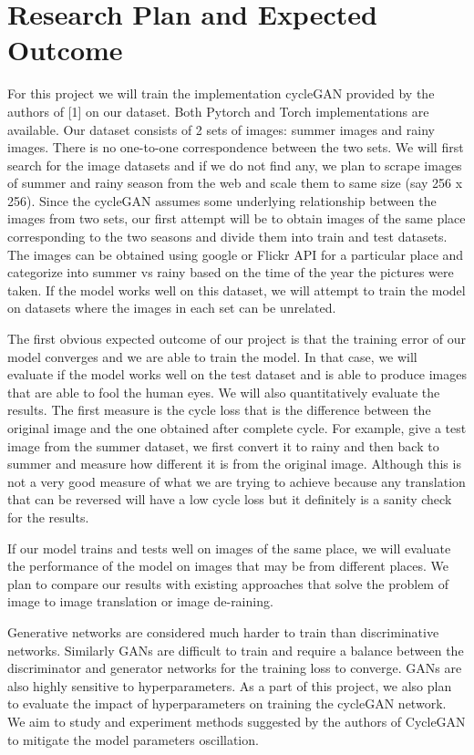 \documentclass{article}
\begin{document}
\section{Research Plan and Expected Outcome}
\label{headings}

For this project we will train the implementation cycleGAN provided by the 
authors of [1] on our dataset. Both Pytorch and Torch implementations are 
available. Our dataset consists of 2 sets of images: summer images and 
rainy images. There is no one-to-one correspondence between the two sets. 
We will first search for the image datasets and if we do not find any, we 
plan to scrape images of summer and rainy season from the web and scale 
them to same size (say 256 x 256). Since the cycleGAN assumes some 
underlying relationship between the images from two sets, our first 
attempt will be to obtain images of the same place corresponding to the 
two seasons and divide them into train and test datasets. The images can
be obtained using google or Flickr API for a particular place and 
categorize into summer vs rainy based on the time of the year the 
pictures were taken. If the model works well on this dataset, we will 
attempt to train the model on datasets where the images in each set can 
be unrelated.

The first obvious expected outcome of our project is that the training 
error of our model converges and we are able to train the model. In that 
case, we will evaluate if the model works well on the test dataset and is 
able to produce images that are able to fool the human eyes. We will also 
quantitatively evaluate the results. The first measure is the cycle loss 
that is the difference between the original image and the one obtained 
after complete cycle. For example, give a test image from the summer 
dataset, we first convert it to rainy and then back to summer and measure 
how different it is from the original image. Although this is not a very 
good measure of what we are trying to achieve because any translation that 
can be reversed will have a low cycle loss but it definitely is a sanity 
check for the results.

If our model trains and tests well on images of the same place, we will 
evaluate the performance of the model on images that may be from different 
places. We plan to compare our results with existing approaches that solve 
the problem of image to image translation or image de-raining.

Generative networks are considered much harder to train than discriminative 
networks. Similarly GANs are difficult to train and require a balance 
between the discriminator and generator networks for the training loss 
to converge. GANs are also highly sensitive to hyperparameters. 
As a part of this project, we also plan to evaluate the impact of 
hyperparameters on training the cycleGAN network. We aim to study and 
experiment methods suggested by the authors of CycleGAN to mitigate the 
model parameters oscillation.
\end{document}
